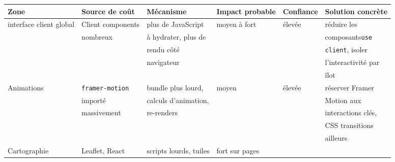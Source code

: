 \documentclass[
  10pt,
  a4paper,
  DIV=11,
  numbers=noendperiod,
  oneside]{scrreprt}
\newcounter{none} %
\begin{document}
{\def\LTcaptype{none} %
\begin{longtable}[]{@{}
  >{\raggedright\arraybackslash}p{}
  >{\raggedright\arraybackslash}p{}
  >{\raggedright\arraybackslash}p{}
  >{\raggedright\arraybackslash}p{}
  >{\raggedright\arraybackslash}p{}
  >{\raggedright\arraybackslash}p{}@{}}
\toprule\noalign{}
\begin{minipage}[b]{\linewidth}\raggedright
Zone
\end{minipage} & \begin{minipage}[b]{\linewidth}\raggedright
Source de coût
\end{minipage} & \begin{minipage}[b]{\linewidth}\raggedright
Mécanisme
\end{minipage} & \begin{minipage}[b]{\linewidth}\raggedright
Impact probable
\end{minipage} & \begin{minipage}[b]{\linewidth}\raggedright
Confiance
\end{minipage} & \begin{minipage}[b]{\linewidth}\raggedright
Solution concrète
\end{minipage} \\
\midrule\noalign{}
\endhead
\bottomrule\noalign{}
\endlastfoot
interface client global & Client components & plus de JavaScript & moyen
à fort & élevée & réduire les \\
& nombreux & à hydrater, plus de & & & composants\texttt{use} \\
& & rendu côté & & & \texttt{client}, isoler \\
& & navigateur & & & l'interactivité par \\
& & & & & îlot \\
Animations & \texttt{framer-motion} & bundle plus lourd, & moyen &
élevée & réserver Framer \\
& importé & calculs d'animation, & & & Motion aux \\
& massivement & re-renders & & & interactions clés, \\
& & & & & CSS transitions \\
& & & & & ailleurs \\
Cartographie & Leaflet, React & scripts lourds, tuiles & fort sur pages

\end{longtable}}
\end{document}
